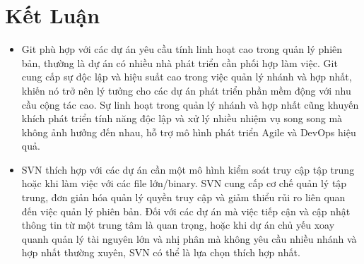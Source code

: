 \section{Kết Luận}
\begin{itemize}
    \item Git phù hợp với các dự án yêu cầu tính linh hoạt cao trong quản lý phiên bản, thường là dự án có nhiều nhà phát triển cần phối hợp làm việc. Git cung cấp sự độc lập và hiệu suất cao trong việc quản lý nhánh và hợp nhất, khiến nó trở nên lý tưởng cho các dự án phát triển phần mềm động với nhu cầu cộng tác cao. Sự linh hoạt trong quản lý nhánh và hợp nhất cũng khuyến khích phát triển tính năng độc lập và xử lý nhiều nhiệm vụ song song mà không ảnh hưởng đến nhau, hỗ trợ mô hình phát triển Agile và DevOps hiệu quả.
    \item SVN thích hợp với các dự án cần một mô hình kiểm soát truy cập tập trung hoặc khi làm việc với các file lớn/binary. SVN cung cấp cơ chế quản lý tập trung, đơn giản hóa quản lý quyền truy cập và giảm thiểu rủi ro liên quan đến việc quản lý phiên bản. Đối với các dự án mà việc tiếp cận và cập nhật thông tin từ một trung tâm là quan trọng, hoặc khi dự án chủ yếu xoay quanh quản lý tài nguyên lớn và nhị phân mà không yêu cầu nhiều nhánh và hợp nhất thường xuyên, SVN có thể là lựa chọn thích hợp nhất.
\end{itemize}


